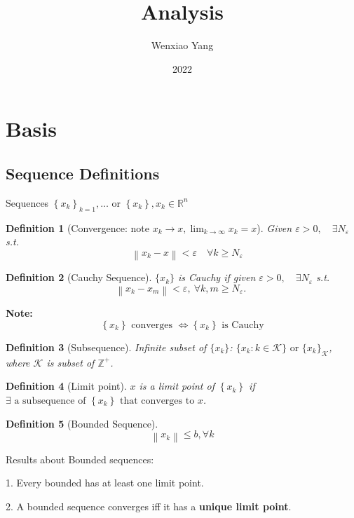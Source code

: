 \documentclass[11pt,a4paper]{article}
\title{Analysis}
\author[*]{Wenxiao Yang}
\affil[*]{Department of Mathematics, University of Illinois at Urbana-Champaign}
\date{2022}
\newtheorem{definition}{Definition}
\begin{document}
\maketitle
\tableofcontents
\newpage

\section{Basis}
\subsection{Sequence Definitions}
Sequences $\left\{x_{k}\right\}_{k=1}, \ldots$ or $\left\{x_{k}\right\}, x_{k} \in \mathbb{R}^{n}$
\begin{definition}[Convergence: note $x_{k} \rightarrow x, \lim _{k \rightarrow \infty} x_{k}=x$]
    Given $\varepsilon>0, \quad \exists N_{\varepsilon}$ s.t. $$\quad\left\|x_{k}-x\right\|<\varepsilon \quad \forall k \geqslant N_{\varepsilon}$$
\end{definition}

\begin{definition}[Cauchy Sequence]
    $\{x_k\}$ is Cauchy if given $\varepsilon>0, \quad \exists N_{\varepsilon}$ s.t.
    $$\left\|x_{k}-x_{m}\right\|<\varepsilon,\  \forall k, m \geqslant N_{\varepsilon} \text {. }$$
\end{definition}
\textbf{Note:}$$\left\{x_{k}\right\} \text { converges } \Longleftrightarrow\left\{x_{k}\right\} \text { is Cauchy}$$


\begin{definition}[Subsequence]
Infinite subset of $\{x_k\}$: $\{x_k:k\in \mathcal{K} \}\text{ or } \{x_k\}_\mathcal{K} $, where $\mathcal{K} $ is subset of $\mathbb{Z}^+$.
\end{definition}

\begin{definition}[Limit point]
$x$ is a limit point of $\left\{x_{k}\right\}$ if $\exists \text { a subsequence of }\left\{x_{k}\right\} \text { that converges to } x$.
\end{definition}

\begin{definition}[Bounded Sequence]
    $$\left\|x_{k}\right\| \leqslant b, \forall k$$
\end{definition}

Results about Bounded sequences:

1. Every bounded has at least one limit point.

2. A bounded sequence converges iff it has a \textbf{unique limit point}.
\end{document}
